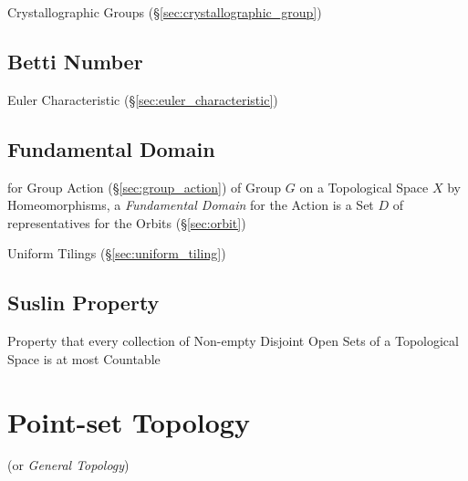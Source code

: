Crystallographic Groups (\S\ref{sec:crystallographic_group})



\subsection{Betti Number}\label{sec:betti_number}

Euler Characteristic (\S\ref{sec:euler_characteristic})



\subsection{Fundamental Domain}\label{sec:fundamental_domain}

for Group Action (\S\ref{sec:group_action}) of Group $G$ on a Topological Space
$X$ by Homeomorphisms, a \emph{Fundamental Domain} for the Action is a Set $D$
of representatives for the Orbits (\S\ref{sec:orbit})

Uniform Tilings (\S\ref{sec:uniform_tiling})



\subsection{Suslin Property}\label{sec:suslin_property}

Property that every collection of Non-empty Disjoint Open Sets of a Topological
Space is at most Countable



\section{Point-set Topology}\label{sec:pointset_topology}

(or \emph{General Topology})

